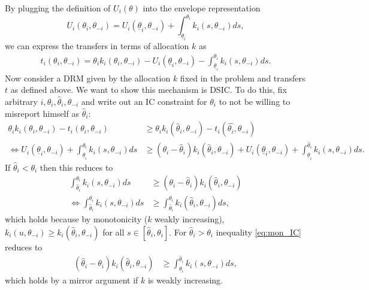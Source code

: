 \documentclass[a4paper]{article}
\begin{document}
	By plugging the definition of $U_i(\theta)$ into the envelope representation
	\begin{equation*}
		U_i(\theta_i, \theta_{-i}) = U_i (\underline{\theta}_i,\theta_{-i}) + \int_{\underline{\theta}_i}^{\theta_i} k_i(s,\theta_{-i}) d s,
	\end{equation*}
	we can express the transfers in terms of allocation $k$ as
	\begin{align*}
		t_i(\theta_i,\theta_{-i}) = \theta_i k_i(\theta_i,\theta_{-i}) - U_i(\underline{\theta}_{i}, \theta_{-i}) - \int_{\underline{\theta}_{i}}^{\theta_i} k_{i} (s,\theta_{-i}) ds.
	\end{align*}
	Now consider a DRM given by the allocation $k$ fixed in the problem and transfers $t$ as defined above. We want to show this mechanism is DSIC. To do this, fix arbitrary $i,\theta_i,\hat{\theta}_i,\theta_{-i}$ and write out an IC constraint for $\theta_i$ to not be willing to misreport himself as $\hat{\theta}_i$:
	\begin{align}
		\theta_i k_i(\theta_i,\theta_{-i}) - t_i(\theta_i,\theta_{-i}) &\geq \theta_i k_i(\hat{\theta}_i,\theta_{-i}) - t_i(\hat{\theta_i},\theta_{-i})
		\nonumber
		\\ \iff
		U_i(\underline{\theta}_{i}, \theta_{-i}) + \int_{\underline{\theta}_{i}}^{\theta_i} k_{i} (s,\theta_{-i}) ds &\geq \left( \theta_i - \hat{\theta}_i \right) k_i(\hat{\theta}_i,\theta_{-i}) + U_i(\underline{\theta}_{i}, \theta_{-i}) + \int_{\underline{\theta}_{i}}^{\hat{\theta}_i} k_{i} (s,\theta_{-i}) ds.
		\label{eq:mon_IC}
	\end{align}
	If $\hat{\theta}_i < \theta_i$ then this reduces to
	\begin{align*}
		\int_{\hat{\theta}_{i}}^{\theta_i} k_{i} (s,\theta_{-i}) ds &\geq \left( \theta_i - \hat{\theta}_i \right) k_i(\hat{\theta}_i,\theta_{-i})
		\\ \iff
		\int_{\hat{\theta}_{i}}^{\theta_i} k_{i} (s,\theta_{-i}) ds &\geq \int_{\hat{\theta}_{i}}^{\theta_i} k_{i} (\hat{\theta}_i,\theta_{-i}) ds,
	\end{align*}
	which holds because by monotonicity ($k$ weakly increasing), $k_{i} (u,\theta_{-i}) \geq k_{i} (\hat{\theta}_i,\theta_{-i})$ for all $s \in [\hat{\theta}_i, \theta_i]$. For $\hat{\theta}_i > \theta_i$ inequality \eqref{eq:mon_IC} reduces to
	\begin{align*}
		\left( \hat{\theta}_i - \theta_i \right) k_i(\hat{\theta}_i,\theta_{-i}) & \geq \int_{\theta_{i}}^{\hat{\theta}_i} k_{i} (s,\theta_{-i}) ds,
	\end{align*}
	which holds by a mirror argument if $k$ is weakly increasing.
\fi
\end{document}
